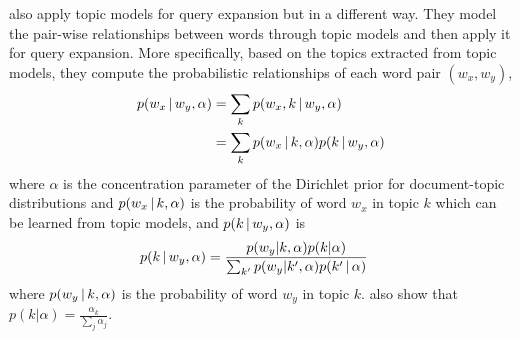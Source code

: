 \citet{Park-2009} also apply topic models for query expansion but in a
different way. They model the pair-wise relationships between words
through topic models and then apply it for query expansion. More
specifically, based on the topics extracted from topic models, they
compute the probabilistic relationships of each word pair $(w_x,
w_y)$,
\begin{align}
p(w_x \, | \, w_y, \alpha) &= \sum_k p(w_x, k  \, | \,  w_y, \alpha) \\
&= \sum_k p(w_x  \, | \,  k, \alpha) p(k  \, | \,  w_y, \alpha) \notag
\end{align}
where $\alpha$ is the concentration parameter of the Dirichlet prior
for document-topic distributions and $p(w_x  \, | \,  k, \alpha)$ is the
probability of word $w_x$ in topic $k$ which can be learned from topic models, and
$p(k  \, | \,  w_y, \alpha)$ is
\begin{align}
p(k  \, | \, w_y, \alpha) 
&= \frac{p(w_y|k,\alpha)p(k|\alpha)}{\sum_{k'} p(w_y|k',\alpha)p(k' \, | \, \alpha)} \notag
\end{align}
where $p(w_y \, | \, k,\alpha)$ is the probability of word $w_y$ in topic $k$. 
\citet{Park-2009} also show that $p(k|\alpha) = \frac{\alpha_k}{\sum_j \alpha_j}$.
